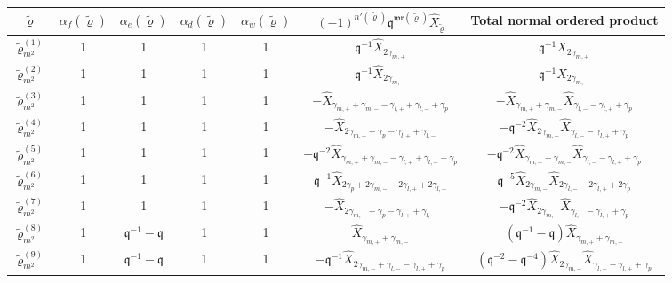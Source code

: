 \documentclass{article}
\numberwithin{equation}{section}
\newcommand{\mq}{\mathfrak{q}}
\begin{document}
\begin{center}
\begin{tabular}{|c|c|c|c|c|c|c|} 
 \hline
 $\tilde{\varrho}$ & $\alpha_f(\tilde{\varrho})$ & $\alpha_e(\tilde{\varrho})$ & $\alpha_d(\tilde{\varrho})$ & $\alpha_w(\tilde{\varrho})$ & $(-1)^{n'(\tilde{\varrho})} \mq^{\mathfrak{wr}(\tilde{\varrho})} \hat{X}_{\tilde{\varrho}}$ & Total normal ordered product \\
 \hline\hline
 $\tilde{\varrho}_{m^2}^{(1)}$ & 1 & 1 & 1 & 1 & $\mq^{-1} \hat{X}_{2\gamma_{m,+}}$ &  $\mq^{-1} \hat{X}_{2\gamma_{m,+}}$ \\ 
 
 $\tilde{\varrho}_{m^2}^{(2)}$ & 1 & 1 & 1 & 1 & $\mq^{-1} \hat{X}_{2\gamma_{m,-}}$ & $\mq^{-1} \hat{X}_{2\gamma_{m,-}}$  \\
 
 $\tilde{\varrho}_{m^2}^{(3)}$ & 1 & 1 & 1 & 1 & $-\hat{X}_{\gamma_{m,+}+\gamma_{m,-}-\gamma_{l,+}+\gamma_{l,-}+\gamma_p}$ &  $-\hat{X}_{\gamma_{m,+}+\gamma_{m,-}}\hat{X}_{\gamma_{l,-}-\gamma_{l,+}+\gamma_p}$\\
 
 $\tilde{\varrho}_{m^2}^{(4)}$ & 1 & 1 & 1 & 1 & $-\hat{X}_{2\gamma_{m,-}+\gamma_p-\gamma_{l,+}+\gamma_{l,-}}$ & $-\mq^{-2}\hat{X}_{2\gamma_{m,-}}\hat{X}_{\gamma_{l,-}-\gamma_{l,+}+\gamma_p}$ \\
 
 $\tilde{\varrho}_{m^2}^{(5)}$ & 1 & 1 & 1 & 1 & $-\mq^{-2}\hat{X}_{\gamma_{m,+}+\gamma_{m,-}-\gamma_{l,+}+\gamma_{l,-}+\gamma_p}$ & $-\mq^{-2}\hat{X}_{\gamma_{m,+}+\gamma_{m,-}}\hat{X}_{\gamma_{l,-}-\gamma_{l,+}+\gamma_p}$ \\
 
 $\tilde{\varrho}_{m^2}^{(6)}$ & 1 & 1 & 1 & 1 & $\mq^{-1}\hat{X}_{2\gamma_p+2\gamma_{m,-}-2\gamma_{l,+}+2\gamma_{l,-}}$ & $\mq^{-5}\hat{X}_{2\gamma_{m,-}}\hat{X}_{2\gamma_{l,-}-2\gamma_{l,+}+2\gamma_p}$ \\
 
 $\tilde{\varrho}_{m^2}^{(7)}$ & 1 & 1 & 1 & 1 & $-\hat{X}_{2\gamma_{m,-}+\gamma_p-\gamma_{l,+}+\gamma_{l,-}}$ & $-\mq^{-2}\hat{X}_{2\gamma_{m,-}}\hat{X}_{\gamma_{l,-}-\gamma_{l,+}+\gamma_p}$ \\
 
 $\tilde{\varrho}_{m^2}^{(8)}$ & 1 & $\mq^{-1}-\mq$ & 1 & 1 & $\hat{X}_{\gamma_{m,+}+\gamma_{m,-}}$ & $(\mq^{-1}-\mq)\hat{X}_{\gamma_{m,+}+\gamma_{m,-}}$ \\
 
 $\tilde{\varrho}_{m^2}^{(9)}$ & 1 & $\mq^{-1}-\mq$ & 1 & 1 & $-\mq^{-1}\hat{X}_{2\gamma_{m,-}+\gamma_{l,-}-\gamma_{l,+}+\gamma_p}$ & $(\mq^{-2}-\mq^{-4})\hat{X}_{2\gamma_{m,-}}\hat{X}_{\gamma_{l,-}-\gamma_{l,+}+\gamma_p}$\\
 
 \hline
\end{tabular}
\end{center}
\end{document}
